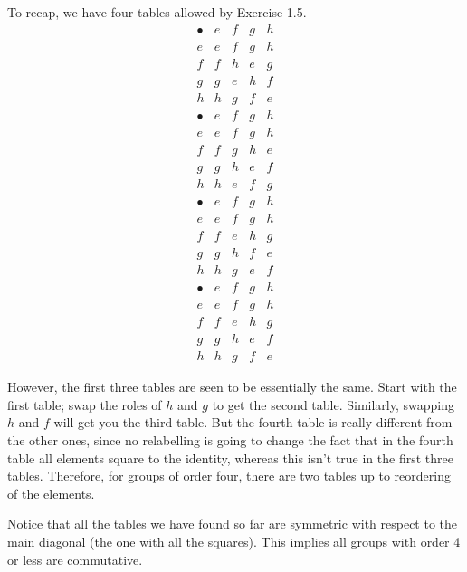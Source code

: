 \begin{solution}
	To recap, we have four tables allowed by Exercise 1.5.
	{%
		\renewcommand{\arraystretch}{1.5}
		\[
		\begin{array}{c||c|c|c|c}
			\bullet & e & f & g & h\\
			\hline
			\hline
			e & e & f & g & h\\
			\hline
			f & f & h & e & g\\
			\hline
			g & g & e& h &f \\
			\hline
			h & h & g  & f & e
		\end{array}
		\]
	}
	{%
		\renewcommand{\arraystretch}{1.5}
		\[
		\begin{array}{c||c|c|c|c}
			\bullet & e & f & g & h\\
			\hline
			\hline
			e & e & f & g & h\\
			\hline
			f & f & g & h & e\\
			\hline
			g & g & h& e & f\\
			\hline
			h & h & e  & f & g
		\end{array}
		\]
	}
	{%
		\renewcommand{\arraystretch}{1.5}
		\[
		\begin{array}{c||c|c|c|c}
			\bullet & e & f & g & h\\
			\hline
			\hline
			e & e & f & g & h\\
			\hline
			f & f &e & h & g\\
			\hline
			g & g & h & f & e\\
			\hline
			h & h &  g & e & f
		\end{array}
		\]
	}
	{%
		\renewcommand{\arraystretch}{1.5}
		\[
		\begin{array}{c||c|c|c|c}
			\bullet & e & f & g & h\\
			\hline
			\hline
			e & e & f & g & h\\
			\hline
			f & f &e & h & g\\
			\hline
			g & g & h & e & f\\
			\hline
			h & h &  g & f & e
		\end{array}
		\]
	}

	However, the first three tables are seen to be essentially the same. Start with the first table; swap the roles of $h$ and $g$ to get the second table. Similarly, swapping $h$ and $f$ will get you the third table. But the fourth table is really different from the other ones, since no relabelling is going to change the fact that in the fourth table all elements square to the identity, whereas this isn't true in the first three tables. Therefore, for groups of order four, there are two tables up to reordering of the elements.
	
	Notice that all the tables we have found so far are symmetric with respect to the main diagonal (the one with all the squares). This implies all groups with order 4 or less are commutative.	
\end{solution}

